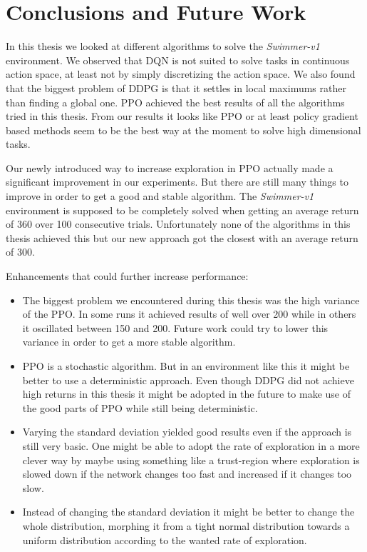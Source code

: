 \chapter{Conclusions and Future Work}
\label{section:conclusion}

In this thesis we looked at different algorithms to solve the \emph{Swimmer-v1} environment.
We observed that DQN is not suited to solve tasks in continuous action space, at least not by simply discretizing the action space.
We also found that the biggest problem of DDPG is that it settles in local maximums rather than finding a global one.
PPO achieved the best results of all the algorithms tried in this thesis.
From our results it looks like PPO or at least policy gradient based methods seem to be the best way at the moment to solve high dimensional tasks.


Our newly introduced way to increase exploration in PPO actually made a significant improvement in our experiments.
But there are still many things to improve in order to get a good and stable algorithm.
The \emph{Swimmer-v1} environment is supposed to be completely solved when getting an average return of 360 over 100 consecutive trials.
Unfortunately none of the algorithms in this thesis achieved this but our new approach got the closest with an average return of 300.

Enhancements that could further increase performance:

\begin{itemize}
  \item The biggest problem we encountered during this thesis was the high variance of the PPO.
  In some runs it achieved results of well over 200 while in others it oscillated between 150 and 200.
  Future work could try to lower this variance in order to get a more stable algorithm.
  \item PPO is a stochastic algorithm. But in an environment like this it might be better to use a deterministic approach.
  Even though DDPG did not achieve high returns in this thesis it might be adopted in the future to make use of the good parts of PPO while still being deterministic.
  \item Varying the standard deviation yielded good results even if the approach is still very basic.
  One might be able to adopt the rate of exploration in a more clever way by maybe using something like a trust-region where exploration is slowed down if the network changes too fast and increased if it changes too slow.
  \item Instead of changing the standard deviation it might be better to change the whole distribution, morphing it from a tight normal distribution towards a uniform distribution according to the wanted rate of exploration.
\end{itemize}

